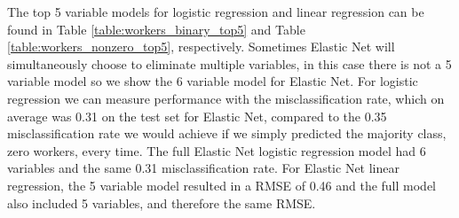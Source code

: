 \documentclass{article}
\begin{document}
The top 5 variable models for logistic regression and linear regression can be found in Table \ref{table:workers_binary_top5} 
and Table \ref{table:workers_nonzero_top5}, respectively. 
Sometimes Elastic Net will simultaneously choose to eliminate multiple variables, in this case there is not a 5 
variable model so we show the 6 variable model for Elastic Net. For logistic regression we can measure performance with the 
misclassification rate, which on average was 0.31 on the test set for Elastic Net, compared to the 0.35 misclassification rate we 
would achieve if we simply predicted the majority class, zero workers, every time.  The full Elastic Net logistic regression model 
had 6 variables and the same 0.31 misclassification rate. For Elastic Net linear regression, the 5 variable model resulted in a 
RMSE of 0.46 and the full model also included 5 variables, and therefore the same RMSE.
\end{document}
